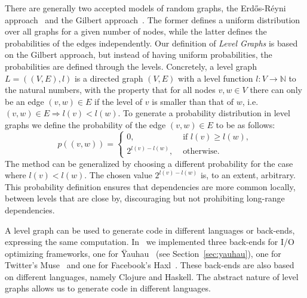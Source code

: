 There are generally two accepted models of random graphs, the Erd\H{o}s-R\'{e}yni approach~\cite{erdosreyni} and the Gilbert approach~\cite{gilbert1959random}.
The former defines a uniform distribution over all graphs for a given number of nodes, while the latter defines the probabilities of the edges independently.
Our definition of \emph{Level Graphs} is based on the Gilbert approach, but instead of having uniform probabilities, the probabilities are defined through the levels.
Concretely, a level graph $L = ((V,E),l)$ is a directed graph $(V,E)$ with a level function $l : V \rightarrow \mathbb{N}$ to the natural numbers, with the property that for all nodes $v,w \in V$ there can only be an edge $(v,w) \in E$ if the level of $v$ is smaller than that of $w$, i.e. $(v,w) \in E \Rightarrow l(v) < l(w)$.
To generate a probability distribution in level graphs we define the probability of the edge $(v,w) \in E$ to be as follows:
\[  p( (v,w) ) = \left\{
    \begin{array}{ll}
      0, & \text{ if } l(v) \geq l(w), \\
      2^{l(v)-l(w)}, & \text{ otherwise.}
    \end{array} \right. \]
The method can be generalized by choosing a different probability for the case where $l(v) < l(w)$.
The chosen value $2^{l(v)-l(w)}$ is, to an extent, arbitrary.
This probability definition ensures that dependencies are more common locally, between levels that are close by, discouraging but not prohibiting long-range dependencies.

A level graph can be used to generate code in different languages or back-ends, expressing the same computation.
In~\cite{goens_multiprog18} we implemented three back-ends for \ac{I/O} optimizing frameworks, one for \"{Y}auhau~\cite{ertel_cc18} (see Section~\ref{sec:yauhau}), one for Twitter's Muse~\cite{muse} and one for Facebook's Haxl~\cite{marlow2014haxl}.
These back-ends are also based on different languages, namely Clojure and Haskell.
The abstract nature of level graphs allows us to generate code in different languages.